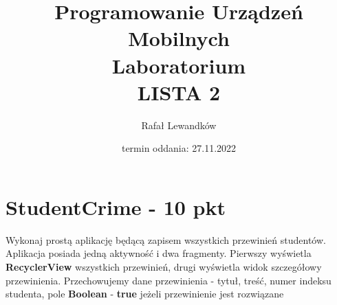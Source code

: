\documentclass[a4paper]{article}
\title{Programowanie Urządzeń Mobilnych \\ Laboratorium \\ \textbf{LISTA 2}}
\author{Rafał Lewandków}
\date{termin oddania: 27.11.2022}
\begin{document}
\maketitle
    

\section*{StudentCrime - 10 pkt}

Wykonaj prostą aplikację będącą zapisem wszystkich przewinień studentów. Aplikacja posiada jedną aktywność i dwa fragmenty. Pierwszy wyświetla \textbf{RecyclerView} wszystkich przewinień, drugi wyświetla widok szczegółowy przewinienia. Przechowujemy dane przewinienia - tytuł, treść, numer indeksu studenta, pole \textbf{Boolean} - \textbf{true} jeżeli przewinienie jest rozwiązane
\end{document}
